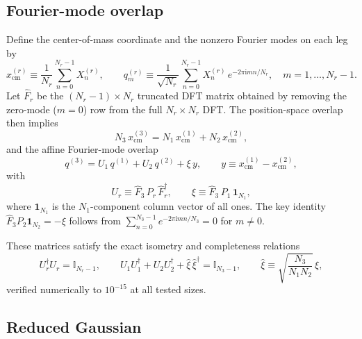 \documentclass[11pt]{article}
\newcommand{\ii}{\mathrm{i}}
\begin{document}
\subsection{Fourier-mode overlap}

Define the center-of-mass coordinate and the nonzero Fourier modes on each leg by
\begin{equation}
x_{\mathrm{cm}}^{(r)} \equiv \frac{1}{N_r}\sum_{n=0}^{N_r-1}X_n^{(r)},
\qquad
q_m^{(r)} \equiv \frac{1}{\sqrt{N_r}}\sum_{n=0}^{N_r-1}X_n^{(r)}\,e^{-2\pi\ii mn/N_r},
\quad m = 1, \dots, N_r - 1.
\label{eq:cm-and-modes}
\end{equation}
Let $\widehat F_r$ be the $(N_r - 1) \times N_r$ truncated DFT matrix obtained by removing the zero-mode ($m=0$) row from the full $N_r \times N_r$ DFT. The position-space overlap then implies
\begin{equation}
N_3\,x_{\mathrm{cm}}^{(3)} = N_1\,x_{\mathrm{cm}}^{(1)} + N_2\,x_{\mathrm{cm}}^{(2)},
\label{eq:cm-overlap}
\end{equation}
and the affine Fourier-mode overlap
\begin{equation}
q^{(3)} = U_1\,q^{(1)} + U_2\,q^{(2)} + \xi\,y,
\qquad
y \equiv x_{\mathrm{cm}}^{(1)} - x_{\mathrm{cm}}^{(2)},
\label{eq:affine}
\end{equation}
with
\begin{equation}
U_r \equiv \widehat F_3\,P_r\,\widehat F_r^\dagger,
\qquad
\xi \equiv \widehat F_3\,P_1\,\mathbf{1}_{N_1},
\label{eq:overlap-matrices}
\end{equation}
where $\mathbf{1}_{N_1}$ is the $N_1$-component column vector of all ones. The key identity $\widehat F_3 P_2 \mathbf{1}_{N_2} = -\xi$ follows from $\sum_{n=0}^{N_3-1}e^{-2\pi\ii mn/N_3} = 0$ for $m \neq 0$.

These matrices satisfy the exact isometry and completeness relations
\begin{equation}
U_r^\dagger U_r = \mathbb{I}_{N_r - 1},
\qquad
U_1 U_1^\dagger + U_2 U_2^\dagger + \widehat\xi\,\widehat\xi^\dagger = \mathbb{I}_{N_3 - 1},
\qquad
\widehat\xi \equiv \sqrt{\frac{N_3}{N_1 N_2}}\,\xi,
\label{eq:completeness}
\end{equation}
verified numerically to $10^{-15}$ at all tested sizes.

\subsection{Reduced Gaussian}
\end{document}
